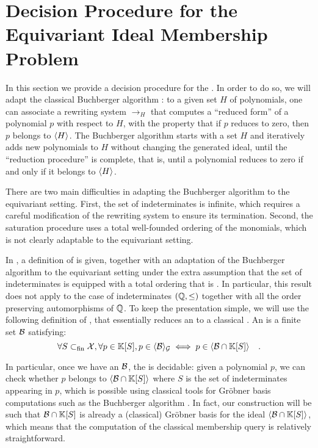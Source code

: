 \section{Decision Procedure for the Equivariant Ideal Membership Problem}
\label{sec:algorithm}

In this section we provide a decision procedure for the . In order to do so, we will adapt the classical Buchberger
algorithm \cite{BUCH76}: to a given set $H$ of polynomials, one can associate a
rewriting system $\to_H$ that computes a ``reduced form'' of a polynomial $p$
with respect to $H$, with the property that if $p$ reduces to zero, then $p$
belongs to $\langle H\rangle_{}$. The Buchberger algorithm starts with a set $H$ and
iteratively adds new polynomials to $H$ without changing the generated ideal,
until the ``reduction procedure'' is complete, that is, until a polynomial
reduces to zero if and only if it belongs to $\langle H\rangle_{}$.

There are two main difficulties in adapting the Buchberger algorithm to the
equivariant setting. First, the set of indeterminates is infinite, which
requires a careful modification of the rewriting system to ensure its
termination. Second, the saturation procedure uses a total well-founded
ordering of the monomials, which is not clearly adaptable to the equivariant
setting.

In \cite{GHOLAS24}, a definition of  is given,
together with an adaptation of the Buchberger algorithm to the equivariant
setting under the extra assumption that the set of indeterminates is equipped
with a  total ordering that is . In particular, this result does not apply to the case of
indeterminates $(\mathbb{Q}, \leq)$ together with all the order preserving
automorphisms of $\mathbb{Q}$.
To keep the presentation simple, we will use the following definition
of , that essentially
reduces an  to a classical
.
An  
is a finite set $\Basis$
satisfying:
\begin{equation}
    \label{eq:grob-eq-bas}
    \forall S \subfin \X, 
    \forall p \in \poly{\K}{S},
    p \in \gen{\Basis}{\group}
    \iff
    p \in \gen{\Basis \cap \poly{\K}{S}}
        \quad .
\end{equation}

In particular, once we have an  $\Basis$, the
 is decidable: given a polynomial $p$,
we can check whether $p$ belongs to $\gen{\Basis \cap \poly{\K}{S}}{}$ where
$S$ is the set of indeterminates appearing in $p$, which is possible using
classical tools for Gröbner basis computations such as the Buchberger algorithm
\cite{BUCH76}. In fact, our construction will be such that $\Basis \cap
\poly{\K}{S}$ is already a (classical) Gröbner basis for the ideal $\gen{\Basis
\cap \poly{\K}{S}}{}$, which means that the computation of the classical
membership query is relatively straightforward.

